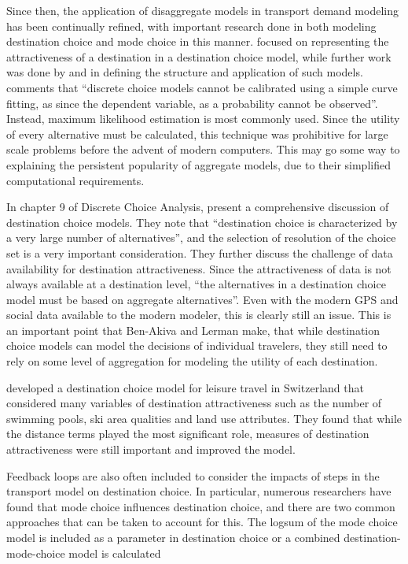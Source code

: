 Since then, the application of disaggregate models in transport demand modeling has been continually refined, with important research done in both modeling destination choice and mode choice in this manner. \textcite{Daly82} focused on representing the attractiveness of a destination in a destination choice model, while further work was done by \textcite{Akiva74} and \textcite{Anas81} in defining the structure and application of such models. \textcite{Train09} comments that \enquote{discrete choice models cannot be calibrated using a simple curve fitting, as since the dependent variable, as a probability cannot be observed}. Instead, maximum likelihood estimation is most commonly used. Since the utility of every alternative must be calculated, this technique was prohibitive for large scale problems before the advent of modern computers. This may go some way to explaining the persistent popularity of aggregate models, due to their simplified computational requirements.

In chapter 9 of Discrete Choice Analysis, \textcite{AkivaLerman85} present a comprehensive discussion of destination choice models. They note that \enquote{destination choice is characterized by a very large number of alternatives}, and the selection of resolution of the choice set is a very important consideration. They further discuss the challenge of data availability for destination attractiveness. Since the attractiveness of data is not always available at a destination level, \enquote{the alternatives in a destination choice model must be based on aggregate alternatives}. Even with the modern GPS and social data available to the modern modeler, this is clearly still an issue. This is an important point that Ben-Akiva and Lerman make, that while destination choice models can model the decisions of individual travelers, they still need to rely on some level of aggregation for modeling the utility of each destination.

\textcite{simma2001destination} developed a destination choice model for leisure travel in Switzerland that considered many variables of destination attractiveness such as the number of swimming pools, ski area qualities and land use attributes. They found that while the distance terms played the most significant role, measures of destination attractiveness were still important and improved the model. 

Feedback loops are also often included to consider the impacts of steps in the transport model on destination choice. In particular, numerous researchers have found that mode choice influences destination choice, and there are two common approaches that can be taken to account for this. The logsum of the mode choice model is included as a parameter in destination choice \parencite{jonnalagadda2001development, mishra2011functional} or a combined destination-mode-choice model is calculated \parencite{newman2010hierarchical, adler1976joint, boyce1983implementation, Outwater15}

